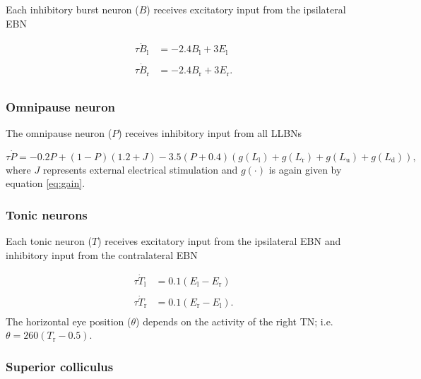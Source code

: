 \documentclass[10pt,a4paper,onecolumn]{article}
\begin{document}
Each inhibitory burst neuron (\(B\)) receives excitatory input from the
ipsilateral EBN

\begin{equation}
\begin{array}{ll}
\tau\dot B_\mathrm{l} &= -2.4B_\mathrm{l}+3E_\mathrm{l} \\\\
\tau\dot B_\mathrm{r} &= -2.4B_\mathrm{r}+3E_\mathrm{r} \textrm{.} \\
\end{array}
\label{eq:ibn}\end{equation}

\hypertarget{omnipause-neuron}{%
\subsubsection{Omnipause neuron}\label{omnipause-neuron}}

The omnipause neuron (\(P\)) receives inhibitory input from all LLBNs

\begin{equation}
\tau\dot P = -0.2P+(1-P)(1.2+J)-3.5(P+0.4)(g(L_\mathrm{l})+g(L_\mathrm{r})+g(L_\mathrm{u})+g(L_\mathrm{d})) \textrm{,}
\label{eq:opn}\end{equation} where \(J\) represents external electrical
stimulation and \(g(\cdot)\) is again given by equation \ref{eq:gain}.

\hypertarget{tonic-neurons}{%
\subsubsection{Tonic neurons}\label{tonic-neurons}}

Each tonic neuron (\(T\)) receives excitatory input from the ipsilateral
EBN and inhibitory input from the contralateral EBN

\begin{equation}
\begin{array}{ll}
\tau\dot T_\mathrm{l} &= 0.1(E_\mathrm{l}-E_\mathrm{r}) \\\\
\tau\dot T_\mathrm{r} &= 0.1(E_\mathrm{r}-E_\mathrm{l}) \textrm{.} \\
\end{array}
\label{eq:tn}\end{equation} The horizontal eye position (\(\theta\))
depends on the activity of the right TN; i.e.
\(\theta = 260(T_\mathrm{r}-0.5)\).

\hypertarget{superior-colliculus}{%
\subsubsection{Superior colliculus}\label{superior-colliculus}}
\end{document}
